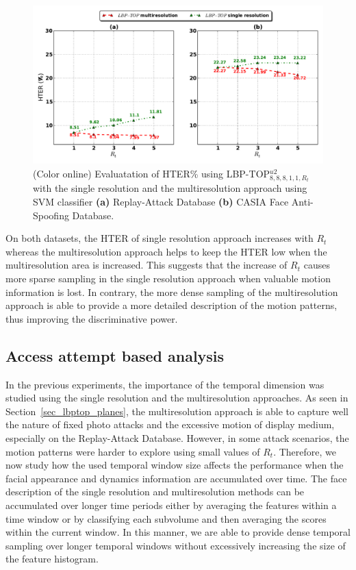 \begin{figure}[!htb]
\begin{center}
\includegraphics [width=\textwidth] {images/proposed_countermeasure/multiVSsingle.pdf}
\caption{(Color online) Evaluatation of HTER\% using LBP-TOP$_{8,8,8,1,1,R_t}^{u2}$ with the single resolution and the multiresolution approach using SVM classifier \textbf{(a)} Replay-Attack Database \textbf{(b)} CASIA Face Anti-Spoofing Database.} \label{fig:multiVSsingle}
\end{center}
\end{figure}


On both datasets, the HTER of single resolution approach increases with $R_t$ whereas the multiresolution approach helps to keep the HTER low when the multiresolution area is increased. This suggests that the increase of $R_t$ causes more sparse sampling in the single resolution approach when valuable motion information is lost. In contrary, the more dense sampling of the multiresolution approach is able to provide a more detailed description of the motion patterns, thus improving the discriminative power.


\subsection{Access attempt based analysis}
\label{sec_attempt}

In the previous experiments, the importance of the temporal dimension was studied using the single resolution and the multiresolution approaches. As seen in Section~\ref{sec_lbptop_planes}, the multiresolution approach is able to capture well the nature of fixed photo attacks and the excessive motion of display medium, especially on the Replay-Attack Database. However, in some attack scenarios, the motion patterns were harder to explore using small values of $R_t$. Therefore, we now study how the used temporal window size affects the performance when the facial appearance and dynamics information are accumulated over time. The face description of the single resolution and multiresolution methods can be accumulated over longer time periods either by averaging the features within a time window or by classifying each subvolume and then averaging the scores within the current window. In this manner, we are able to provide dense temporal sampling over longer temporal windows without excessively increasing the size of the feature histogram.

